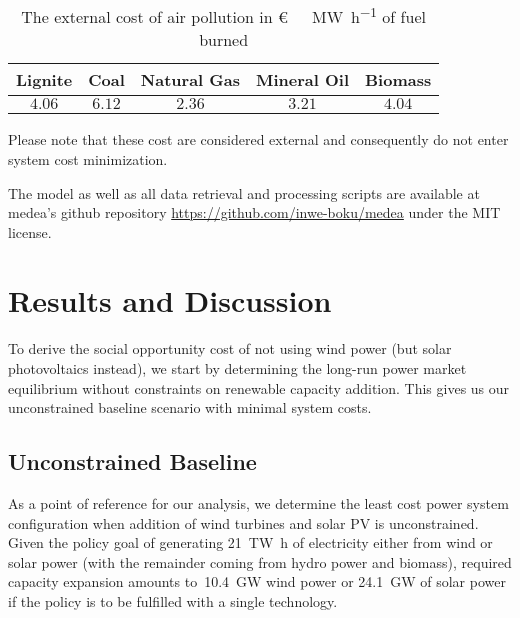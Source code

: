 \documentclass[review, 3p, times, 12pt]{elsarticle} %
\begin{document}
\begin{table}[ht]
\centering
\begin{tabular}{c c c c c}
\toprule
Lignite & Coal & Natural Gas & Mineral Oil & Biomass \\
\midrule
$4.06$ & $6.12$ & $2.36$ & $3.21$ & $4.04$ \\
\bottomrule
\end{tabular}
\caption{The external cost of air pollution in \SI{}[\euro]{\per\mega\watt\per\hour} of fuel burned}
\label{tab:air_pollution_cost}
\end{table}
Please note that these cost are considered external and consequently do not enter system cost minimization.

The model as well as all data retrieval and processing scripts are available at medea's github repository
\url{https://github.com/inwe-boku/medea} under the MIT license.

\section{Results and Discussion}\label{sec:results-discussion}
To derive the social opportunity cost of not using wind power (but solar photovoltaics instead), we start by
determining the long-run power market equilibrium without constraints on renewable capacity addition.
This gives us our unconstrained baseline scenario with minimal system costs.

\subsection{Unconstrained Baseline}\label{subsec:baseline}
As a point of reference for our analysis, we determine the least cost power system configuration when addition of
wind turbines and solar PV is unconstrained.
Given the policy goal of generating \SI{21}{\tera\watt\hour} of electricity either from wind or solar power (with
the remainder coming from hydro power and biomass), required capacity expansion amounts to~\SI{10.4}{\giga\watt}
wind power or \SI{24.1}{\giga\watt} of solar power if the policy is to be fulfilled with a single technology.
\end{document}
